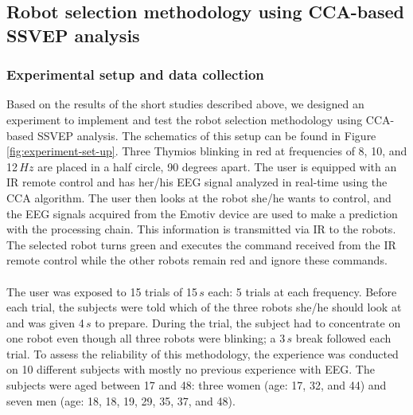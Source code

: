 \documentclass[smallextended]{svjour3}
\begin{document}
\subsection{Robot selection methodology using CCA-based SSVEP analysis}
\subsubsection{Experimental setup and data collection}
Based on the results of the short studies described above, we designed an experiment to implement and test the robot selection methodology using CCA-based SSVEP analysis. The schematics of this setup can be found in Figure \ref{fig:experiment-set-up}.
Three Thymios blinking in red at frequencies of 8, 10, and 12\,$Hz$ are placed in a half circle, 90 degrees apart.
The user is equipped with an IR remote control and has her/his EEG signal analyzed in real-time using the CCA algorithm.
The user then looks at the robot she/he wants to control, and the EEG signals acquired from the Emotiv device are used to make a prediction with the processing chain.
This information is transmitted via IR to the robots.
The selected robot turns green and executes the command received from the IR remote control while the other robots remain red and ignore these commands.\\
\\
The user was exposed to 15 trials of 15\,$s$ each: 5 trials at each frequency. Before each trial, the subjects were told which of the three robots she/he should look at and was given 4\,$s$ to prepare. During the trial, the subject had to concentrate on one robot even though all three robots were blinking; a 3\,$s$ break followed each trial.
To assess the reliability of this methodology, the experience was conducted on 10 different subjects with mostly no previous experience with EEG.
The subjects were aged between 17 and 48: three women (age: 17, 32, and 44) and seven men (age: 18, 18, 19, 29, 35, 37, and 48). 
\end{document}

